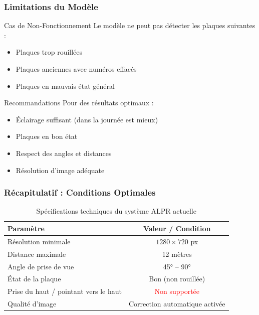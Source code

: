 \documentclass[
	11pt,
	aspectratio=169,
]{beamer}
\begin{document}
\begin{frame}
	\frametitle{Limitations du Modèle}
	
	\begin{alertblock}{Cas de Non-Fonctionnement}
		Le modèle \alert{ne peut pas} détecter les plaques suivantes :
		\begin{itemize}
			\item Plaques trop rouillées
			\item Plaques anciennes avec numéros effacés
			\item Plaques en mauvais état général
		\end{itemize}
	\end{alertblock}
	
	\bigskip
	
	\begin{exampleblock}{Recommandations}
		Pour des résultats optimaux :
		\begin{itemize}
			\item Éclairage suffisant (dans la journée est mieux)
			\item Plaques en bon état
			\item Respect des angles et distances
			\item Résolution d'image adéquate
		\end{itemize}
	\end{exampleblock}
\end{frame}


\begin{frame}
	\frametitle{Récapitulatif : Conditions Optimales}
	
	\begin{table}
		\centering
		\begin{tabular}{lc}
			\toprule
			\textbf{Paramètre} & \textbf{Valeur / Condition} \\
			\midrule
			Résolution minimale & $1280 \times 720$ px \\
			Distance maximale & 12 mètres \\
			Angle de prise de vue & 45° -- 90° \\
			État de la plaque & Bon (non rouillée) \\
			Prise du haut / pointant vers le haut & \textcolor{red}{Non supportée} \\
			Qualité d'image & Correction automatique activée \\
			\bottomrule
		\end{tabular}
		\caption{Spécifications techniques du système ALPR actuelle}
	\end{table}
\end{frame}
\end{document}

